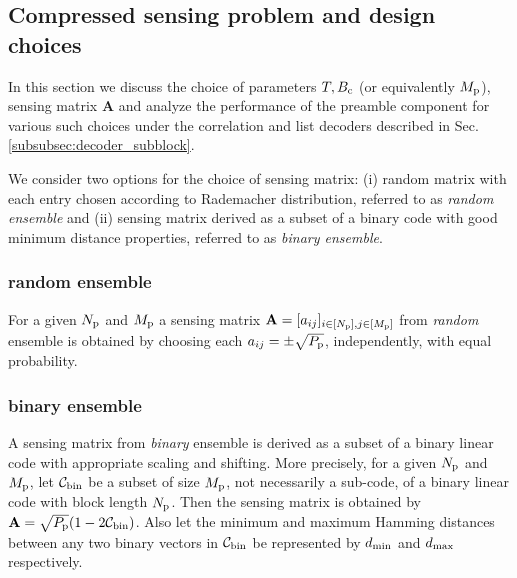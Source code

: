

\subsection{Compressed sensing problem and design choices}
In this section we discuss the choice of parameters $T,B_{\mathrm{c}}$ (or equivalently $M_{\mathrm{p}}$), sensing matrix $\mathbf{A}$ and analyze the performance of the preamble component for various such  choices under the correlation and list decoders described in Sec.\ref{subsubsec:decoder_subblock}. 

We consider two options for the choice of sensing matrix: (i) random matrix with each entry chosen according to Rademacher distribution, referred to as \textit{random ensemble} and (ii) sensing matrix derived as a subset of a binary code with good minimum distance properties, referred to as \textit{binary ensemble}. 

\subsubsection*{random ensemble} 
For a given $N_{\mathrm{p}}$ and $M_{\mathrm{p}}$ a sensing matrix $\mathbf{A}=[a_{ij}]_{i\in[N_{\mathrm{p}}],j\in[M_{\mathrm{p}}]}$ from \emph{random} ensemble is obtained by choosing each $a_{ij}=\pm \sqrt{P_{\mathrm{p}}}$, independently, with equal probability.

\subsubsection*{binary ensemble} 
A sensing matrix from \emph{binary} ensemble is derived as a subset of a binary linear code with appropriate scaling and shifting. More precisely, for a given $N_{\mathrm{p}}$ and $M_{\mathrm{p}}$, let $\mathcal{C}_{\text{bin}}$ be a subset of size $M_{\mathrm{p}}$, not necessarily a sub-code, of a binary linear code with block length $N_{\mathrm{p}}$. Then the sensing matrix is obtained by $\mathbf{A}=\sqrt{P_{\mathrm{p}}}(1-2 \mathcal{C}_{\text{bin}})$. Also let the minimum and maximum Hamming distances between any two binary vectors in $\mathcal{C}_{\text{bin}}$ be represented by $d_{\mathrm{min}}$ and $d_{\mathrm{max}}$ respectively.

